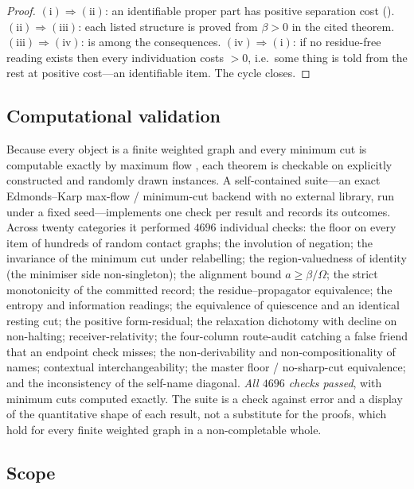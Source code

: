 \documentclass[twocolumn,11pt,a4paper]{article}
\theoremstyle{sup}
\theoremstyle{definition}
\theoremstyle{remark}
\newcommand{\flo}{\beta}
\newcommand{\al}{a}
\newcommand{\Om}{\Omega}
\begin{document}
\begin{proof}
$(\mathrm{i})\Rightarrow(\mathrm{ii})$: an identifiable proper part has positive
separation cost ().
$(\mathrm{ii})\Rightarrow(\mathrm{iii})$: each listed structure is proved from
$\flo>0$ in the cited theorem.
$(\mathrm{iii})\Rightarrow(\mathrm{iv})$:  is among the
consequences. $(\mathrm{iv})\Rightarrow(\mathrm{i})$: if no residue-free reading
exists then every individuation costs $>0$, i.e.\ some thing is told from the
rest at positive cost---an identifiable item. The cycle closes.
\end{proof}

\subsection{Computational validation}

Because every object is a finite weighted graph and every minimum cut is
computable exactly by maximum flow \citep{fordfulkerson1956,menger1927}, each
theorem is checkable on explicitly constructed and randomly drawn instances. A
self-contained suite---an exact Edmonds--Karp max-flow / minimum-cut backend with
no external library, run under a fixed seed---implements one check per result and
records its outcomes. Across twenty categories it performed $4696$ individual
checks: the floor on every item of hundreds of random contact graphs; the
involution of negation; the invariance of the minimum cut under relabelling; the
region-valuedness of identity (the minimiser side non-singleton); the alignment
bound $\al\ge\flo/\Om$; the strict monotonicity of the committed record; the
residue--propagator equivalence; the entropy and information readings; the
equivalence of quiescence and an identical resting cut; the positive
form-residual; the relaxation dichotomy with decline on non-halting;
receiver-relativity; the four-column route-audit catching a false friend that an
endpoint check misses; the non-derivability and non-compositionality of names;
contextual interchangeability; the master floor / no-sharp-cut equivalence; and
the inconsistency of the self-name diagonal. \emph{All $4696$ checks passed}, with
minimum cuts computed exactly. The suite is a check against error and a display of
the quantitative shape of each result, not a substitute for the proofs, which hold
for every finite weighted graph in a non-completable whole.

\subsection{Scope}
\end{document}
